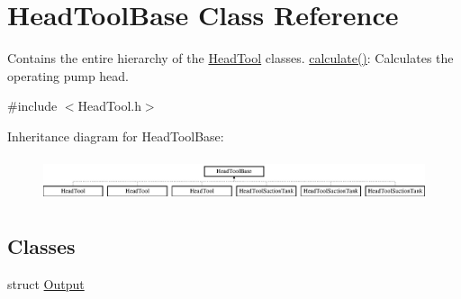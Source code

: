 \hypertarget{class_head_tool_base}{}\section{Head\+Tool\+Base Class Reference}
\label{class_head_tool_base}


Contains the entire hierarchy of the \hyperlink{class_head_tool}{Head\+Tool} classes. \hyperlink{class_head_tool_base_a82024c0ce01699aa24509c964267c392}{calculate()}\+: Calculates the operating pump head.  




{\ttfamily \#include $<$Head\+Tool.\+h$>$}

Inheritance diagram for Head\+Tool\+Base\+:\begin{figure}[H]
\begin{center}
\leavevmode
\includegraphics[height=1.305361cm]{d5/dc5/class_head_tool_base}
\end{center}
\end{figure}
\subsection*{Classes}
\begin{DoxyCompactItemize}
\item 
struct \hyperlink{struct_head_tool_base_1_1_output}{Output}
\end{DoxyCompactItemize}
